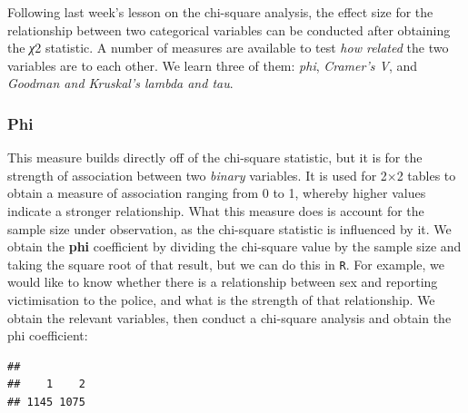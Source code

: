 \documentclass[
]{book}
\newenvironment{Shaded}{\begin{snugshade}}{\end{snugshade}}
\newcommand{\AttributeTok}[1]{\textcolor[rgb]{0.77,0.63,0.00}{#1}}
\newcommand{\CommentTok}[1]{\textcolor[rgb]{0.56,0.35,0.01}{\textit{#1}}}
\newcommand{\DecValTok}[1]{\textcolor[rgb]{0.00,0.00,0.81}{#1}}
\newcommand{\FunctionTok}[1]{\textcolor[rgb]{0.00,0.00,0.00}{#1}}
\newcommand{\NormalTok}[1]{#1}
\newcommand{\OtherTok}[1]{\textcolor[rgb]{0.56,0.35,0.01}{#1}}
\newcommand{\SpecialCharTok}[1]{\textcolor[rgb]{0.00,0.00,0.00}{#1}}
\newcommand{\StringTok}[1]{\textcolor[rgb]{0.31,0.60,0.02}{#1}}
\begin{document}
Following last week's lesson on the chi-square analysis, the effect size for the relationship between two categorical variables can be conducted after obtaining the \emph{χ}2 statistic. A number of measures are available to test \emph{how related} the two variables are to each other. We learn three of them: \emph{phi}, \emph{Cramer's V}, and \emph{Goodman and Kruskal's lambda and tau}.

\hypertarget{phi}{%
\subsubsection{Phi}\label{phi}}

This measure builds directly off of the chi-square statistic, but it is for the strength of association between two \emph{binary} variables. It is used for 2×2 tables to obtain a measure of association ranging from 0 to 1, whereby higher values indicate a stronger relationship.
What this measure does is account for the sample size under observation, as the chi-square statistic is influenced by it. We obtain the \textbf{phi} coefficient by dividing the chi-square value by the sample size and taking the square root of that result, but we can do this in \texttt{R}. For example, we would like to know whether there is a relationship between sex and reporting victimisation to the police, and what is the strength of that relationship. We obtain the relevant variables, then conduct a chi-square analysis and obtain the phi coefficient:

\begin{Shaded}
\end{Shaded}

\begin{verbatim}
## 
##    1    2 
## 1145 1075
\end{verbatim}

\begin{Shaded}
\end{Shaded}
\end{document}
